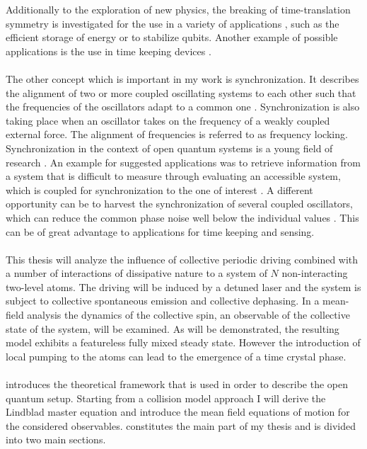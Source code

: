 Additionally to the exploration of new physics, the breaking of time-translation symmetry is investigated for the use in a variety of applications%
, such as the efficient storage of energy \cite{paulino_thermodynamics_2025} or to stabilize qubits. %
Another example of possible applications is the use in time keeping devices \cite{taheri_all-optical_2022}.\\\\
The other concept which is important in my work is synchronization. It describes the alignment of two or more coupled oscillating systems to each other such that the frequencies of the oscillators adapt to a common one \cite{pikovskij_synchronization_2007}. Synchronization is also taking place when an oscillator takes on the frequency of a weakly coupled external force. The alignment of frequencies is referred to as frequency locking. Synchronization in the context of open quantum systems is a young field of research \cite{galve_quantum_2017}. An example for suggested applications was to retrieve information from a system that is difficult to measure through evaluating an accessible system, which is coupled for synchronization to the one of interest \cite{giorgi_probing_2016}. A different opportunity can be to harvest the synchronization of several coupled oscillators, which can reduce the common phase noise well below the individual values \cite{zhang_synchronization_2015,matheny_phase_2014}. This can be of great advantage to applications for time keeping and sensing.\\\\
This thesis will analyze the influence of collective periodic driving combined with a number of interactions of dissipative nature to a system of $N$ non-interacting two-level atoms. The driving will be induced by a detuned laser and the system is subject to collective spontaneous emission and collective dephasing. %
In a mean-field analysis the dynamics of the collective spin, an observable of the collective state of the system, will be examined. As will be demonstrated, the resulting model exhibits a featureless fully mixed steady state. However the introduction of local pumping to the atoms can lead to the emergence of a time crystal phase.\\\\
 introduces the theoretical framework that is used in order to describe the open quantum setup. Starting from a collision model approach I will derive the Lindblad master equation and introduce the mean field equations of motion for the considered observables.  constitutes the main part of my thesis and is divided into two main sections. 

